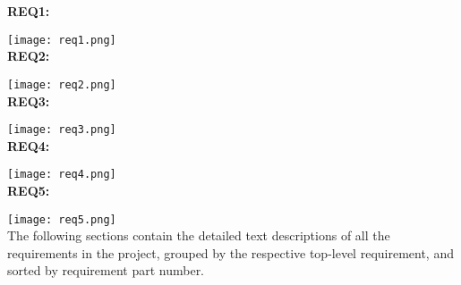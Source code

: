 \textbf{REQ1:}
\nopagebreak[4]

\texttt{[image: req1.png]}\\

\textbf{REQ2:}
\nopagebreak[4]

\texttt{[image: req2.png]}\\

\textbf{REQ3:}
\nopagebreak[4]

\texttt{[image: req3.png]}\\

\textbf{REQ4:}
\nopagebreak[4]

\texttt{[image: req4.png]}\\

\textbf{REQ5:}
\nopagebreak[4]

\texttt{[image: req5.png]}\\

The following sections contain the detailed text descriptions of all the requirements in the project, grouped by the respective top-level requirement, and sorted by requirement part number.










